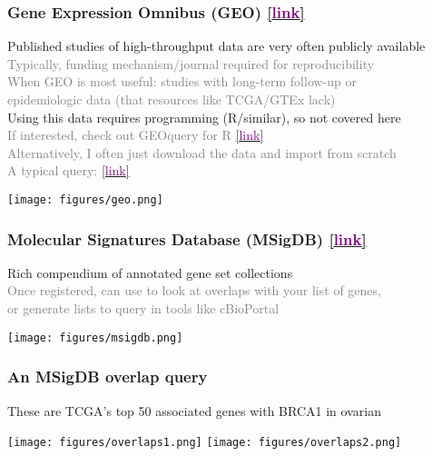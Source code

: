 \documentclass{beamer}
\newcommand{\si}[1]{\hspace{.5cm} \textcolor{gray} {#1}\\}
\newcommand{\sicont}[1]{\hspace{1cm} \textcolor{gray} {#1}\\}
\newcommand{\cref}[1]{\href{#1}{[\textcolor{purple}{link}]}}
\begin{document}
{\begin{frame}[t]
\frametitle{Gene Expression Omnibus (GEO) \cref{https://www.ncbi.nlm.nih.gov/geo/}}
Published studies of high-throughput data are very often publicly available\\
\si{Typically, funding mechanism/journal required for reproducibility}
\si{When GEO is most useful: studies with long-term follow-up or}
\sicont{epidemiologic data (that resources like TCGA/GTEx lack)}
\vspace{.2cm}
Using this data requires programming (R/similar), so not covered here\\
\si{If interested, check out GEOquery for R \cref{https://bioconductor.org/packages/release/bioc/html/GEOquery.html}}
\si{Alternatively, I often just download the data and import from scratch}
\si{A typical query: \cref{https://www.ncbi.nlm.nih.gov/gds/?term=prostate+cancer+african+american}}
\begin{center}
\texttt{[image: figures/geo.png]}
\end{center}
\end{frame}

\begin{frame}[t]
\frametitle{Molecular Signatures Database (MSigDB) \cref{http://software.broadinstitute.org/gsea/msigdb/}}
Rich compendium of annotated gene set collections\\
\si{Once registered, can use to look at overlaps with your list of genes,}
\sicont{or generate lists to query in tools like cBioPortal}
\begin{center}
\texttt{[image: figures/msigdb.png]}
\end{center}
\end{frame}

\begin{frame}[t]
\frametitle{An MSigDB overlap query}
These are TCGA's top 50 associated genes with BRCA1 in ovarian\\
\begin{center}
\texttt{[image: figures/overlaps1.png]}
\texttt{[image: figures/overlaps2.png]}
\end{center}
\end{frame}

}
\end{document}
